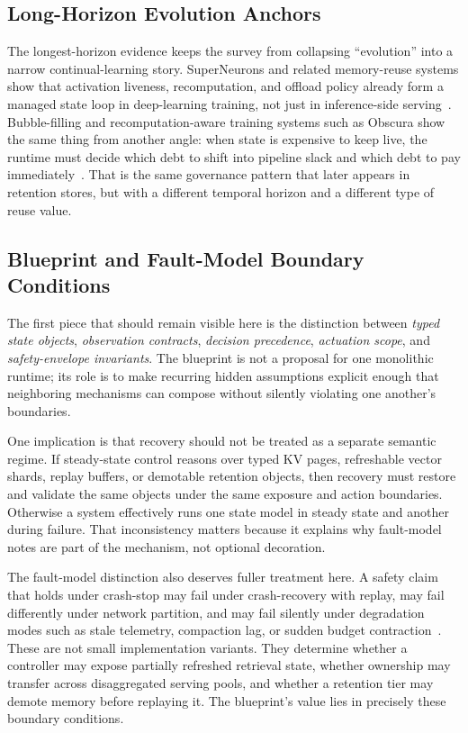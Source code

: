 \subsection{Long-Horizon Evolution Anchors}

The longest-horizon evidence keeps the survey from collapsing ``evolution'' into a narrow continual-learning story. SuperNeurons and related memory-reuse systems show that activation liveness, recomputation, and offload policy already form a managed state loop in deep-learning training, not just in inference-side serving~\cite{wang2018superneurons}. Bubble-filling and recomputation-aware training systems such as Obscura show the same thing from another angle: when state is expensive to keep live, the runtime must decide which debt to shift into pipeline slack and which debt to pay immediately~\cite{huang2025obscura}. That is the same governance pattern that later appears in retention stores, but with a different temporal horizon and a different type of reuse value.

\subsection{Blueprint and Fault-Model Boundary Conditions}

The first piece that should remain visible here is the distinction between \emph{typed state objects}, \emph{observation contracts}, \emph{decision precedence}, \emph{actuation scope}, and \emph{safety-envelope invariants}. The blueprint is not a proposal for one monolithic runtime; its role is to make recurring hidden assumptions explicit enough that neighboring mechanisms can compose without silently violating one another's boundaries.

One implication is that recovery should not be treated as a separate semantic regime. If steady-state control reasons over typed KV pages, refreshable vector shards, replay buffers, or demotable retention objects, then recovery must restore and validate the same objects under the same exposure and action boundaries. Otherwise a system effectively runs one state model in steady state and another during failure. That inconsistency matters because it explains why fault-model notes are part of the mechanism, not optional decoration.

The fault-model distinction also deserves fuller treatment here. A safety claim that holds under crash-stop may fail under crash-recovery with replay, may fail differently under network partition, and may fail silently under degradation modes such as stale telemetry, compaction lag, or sudden budget contraction~\cite{chandy1985snapshot,corbett2012spanner,ongaro2014raft,mao2023morphstream,zhao2024recovery,wang2026candor,zhang2026flowrag}. These are not small implementation variants. They determine whether a controller may expose partially refreshed retrieval state, whether ownership may transfer across disaggregated serving pools, and whether a retention tier may demote memory before replaying it. The blueprint's value lies in precisely these boundary conditions.

